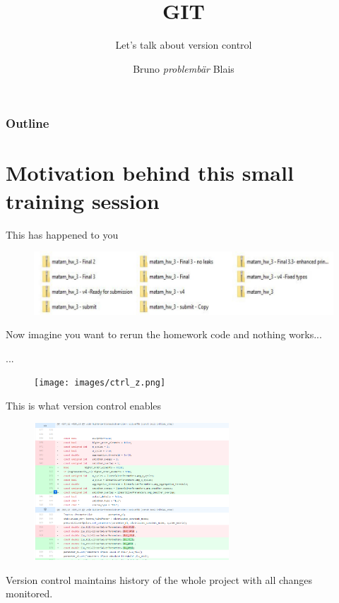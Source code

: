 \documentclass[c,11pt,xcolor=dvipsnames, aspectratio=169]{beamer}
\title{\textbf{GIT}}
\subtitle{Let's talk about version control}
\author{Bruno \textit{problembär} Blais}
\begin{document}
{
\begin{frame}[noframenumbering]
  \titlepage
\end{frame}
}

\begin{frame}
	\frametitle{\textbf{Outline}}
	\tableofcontents
\end{frame}

\section{Motivation behind this small training session}

\begin{frame} {This has happened to you}

	\begin{figure}[ht]
		\centering
		\includegraphics[width=1\textwidth]{images/many_vers.jpg}
	\end{figure}


	{
Now imagine you want to rerun the homework code and nothing works...
	}
\end{frame}

\begin{frame} {...}
	\begin{figure}[ht]
		\centering
		\texttt{[image: images/ctrl\_z.png]}
	\end{figure}
\end{frame}


\begin{frame} {This is what version control enables}

	\begin{figure}[ht]
		\centering
		\includegraphics[width=0.65\textwidth]{images/version_control_ex.png}
	\end{figure}


	{
Version control maintains history of the whole project with all changes monitored.
	}
\end{frame}
\end{document}
